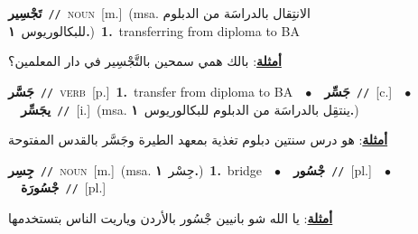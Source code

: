 \documentclass[10pt,a4paper,twoside]{article} %
\begin{document}
\begin{multicols}{2}
{\setlength\topsep{0pt}\textbf{\foreignlanguage{arabic}{تَجْسِير}}\ {\color{gray}\texttt{//}\color{black}}\ \textsc{noun}\ [m.]\ \color{gray}(msa. \foreignlanguage{arabic}{الانتِقال بالدراسَة من الدبلوم للبكالوريوس}~\foreignlanguage{arabic}{\textbf{١.}})\color{black}\ \textbf{1.}~transferring from diploma to BA\  \begin{flushright}\color{gray}\foreignlanguage{arabic}{\textbf{\underline{\foreignlanguage{arabic}{أمثلة}}}: بالك همي سمحين بالتَّجْسِير في دار المعلمين؟}\end{flushright}\color{black}} \vspace{2mm}

{\setlength\topsep{0pt}\textbf{\foreignlanguage{arabic}{جَسَّر}}\ {\color{gray}\texttt{//}\color{black}}\ \textsc{verb}\ [p.]\ \textbf{1.}~transfer from diploma to BA\ \ $\bullet$\ \ \setlength\topsep{0pt}\textbf{\foreignlanguage{arabic}{جَسِّر}}\ {\color{gray}\texttt{//}\color{black}}\ [c.]\ \ $\bullet$\ \ \setlength\topsep{0pt}\textbf{\foreignlanguage{arabic}{يجَسِّر}}\ {\color{gray}\texttt{//}\color{black}}\ [i.]\ \color{gray}(msa. \foreignlanguage{arabic}{ينتقِل بالدراسَة من الدبلوم للبكالوريوس}~\foreignlanguage{arabic}{\textbf{١.}})\color{black}\  \begin{flushright}\color{gray}\foreignlanguage{arabic}{\textbf{\underline{\foreignlanguage{arabic}{أمثلة}}}: هو درس سنتين دبلوم تغذية بمعهد الطيرة وجَسَّر بالقدس المفتوحة}\end{flushright}\color{black}} \vspace{2mm}

{\setlength\topsep{0pt}\textbf{\foreignlanguage{arabic}{جِسِر}}\ {\color{gray}\texttt{//}\color{black}}\ \textsc{noun}\ [m.]\ \color{gray}(msa. \foreignlanguage{arabic}{جِسْر}~\foreignlanguage{arabic}{\textbf{١.}})\color{black}\ \textbf{1.}~bridge\ \ $\bullet$\ \ \setlength\topsep{0pt}\textbf{\foreignlanguage{arabic}{جْسُور}}\ {\color{gray}\texttt{//}\color{black}}\ [pl.]\ \ $\bullet$\ \ \setlength\topsep{0pt}\textbf{\foreignlanguage{arabic}{جْسُورَة}}\ {\color{gray}\texttt{//}\color{black}}\ [pl.]\  \begin{flushright}\color{gray}\foreignlanguage{arabic}{\textbf{\underline{\foreignlanguage{arabic}{أمثلة}}}: يا الله شو بانيين جْسُور بالأردن وياريت الناس بتستخدمها}\end{flushright}\color{black}} \vspace{2mm}


\end{multicols}
\end{document}

